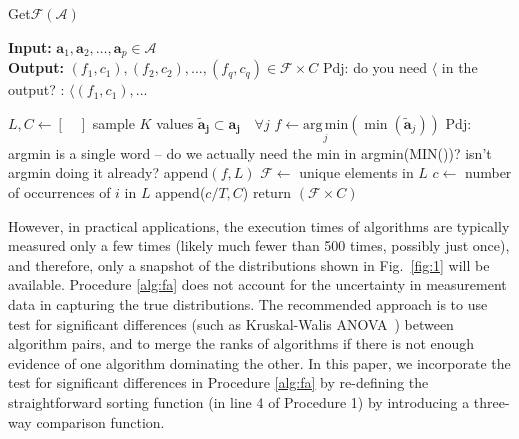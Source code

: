 \documentclass[conference]{IEEEtran}
\newcommand{\p}[1]{{\color{blue} Pdj: #1}}
\begin{document}
\begin{algorithm}
	\caption{ Get$\mathcal{F}$$(\mathcal{A})$ }
	\label{alg:fa}
	\hspace*{\algorithmicindent} \textbf{Input: } $ \mathbf{a}_1,\mathbf{a}_2 ,\dots, \mathbf{a}_p\in \mathcal{A}$ \\
	\hspace*{\algorithmicindent} \textbf{Output: } $ (f_1,c_1), (f_2, c_2), \dots, (f_q,c_q) \in \mathcal{F} \times C  $
        \p{do you need $\langle$ in the output? : $\langle (f_1,c_1), ... $}
	\begin{algorithmic}[1] 
		\State $L, C \leftarrow [ \quad ]$ 
		\State sample $K$ values $\mathbf{\tilde{a}_{j}} \subset \mathbf{a_j} \quad \forall j$  
		\State $ f \leftarrow \underset{j}{\mathrm{arg\,min}}(\min(\mathbf{\tilde{a}}_j ))$
                \p{argmin is a single word -- do we actually need the min in argmin(MIN())? isn't argmin doing it already?}
	    \State append$(f,L)$
		\EndFor
		\State $\mathcal{F} \leftarrow $ unique elements in $L$ 
		\State $c \leftarrow$ number of occurrences of $i$ in $L$ 
		\State append($c/T, C$)
		\EndFor
		\State return $(\mathcal{F} \times C)$
              \end{algorithmic}
\end{algorithm}

However, in practical applications, the execution times of algorithms are typically
measured only a few times (likely much fewer than 500 times, possibly just once), and therefore, only a snapshot of the distributions
shown in Fig.~\ref{fig:1} will be available. Procedure \ref{alg:fa} does not account for the uncertainty in measurement data in capturing the true distributions. 
The recommended approach is to use test for significant differences (such as Kruskal-Walis
ANOVA~\cite{hoefler2015scientific}) between algorithm pairs, and to merge the ranks of algorithms if there is not enough
evidence of one algorithm dominating the other. In this paper, we incorporate the test for significant differences in
Procedure \ref{alg:fa} by re-defining the straightforward sorting function (in line 4 of Procedure 1) by introducing a
three-way comparison function. 
\end{document}
